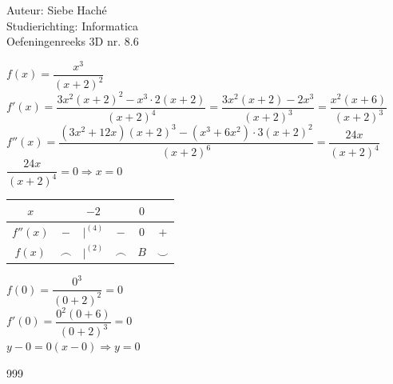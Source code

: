 \documentclass[a4paper]{article}
\begin{document}
  
\noindent \large Auteur: Siebe Haché \\
\noindent \large Studierichting: Informatica\\
\noindent \large Oefeningenreeks 3D nr. 8.6\\

\medskip
\normalsize

$ f(x) = \dfrac{x^{3}}{(x + 2)^{2}} $ \\

$ f'(x) = \dfrac{3x^{2}(x+2)^{2} - x^{3} \cdot 2(x+2)}{(x+2)^{4}} = \dfrac{3x^{2}(x+2) - 2x^{3}}{(x+2)^{3}} = \dfrac{x^{2}(x+6)}{(x+2)^{3}} $ \\

$ f''(x) = \dfrac{(3x^{2}+12x)(x+2)^{3} - (x^{3}+6x^{2}) \cdot 3(x+2)^{2}}{(x+2)^{6}} = \dfrac{24x}{(x+2)^{4}} $ \\

$ \dfrac{24x}{(x+2)^{4}} = 0 \Rightarrow x = 0$\\

\begin{tabular}{c|ccccc} 
	$x$	&		&	$-2$	&		&	$0$	&	 \\ \hline
        
	$f''(x)$          & $-$                 & $|^{(4)}$               & $-$                   & $0$             & $+$ \\ \hline

  $f(x)$  & $\frown$ & $|^{(2)}$  & $\frown$ & $B$  & $\smile$\\
        
\end{tabular}

$ f(0) = \dfrac{0^{3}}{(0 + 2)^{2}} = 0 $ \\

$ f'(0) = \dfrac{0^{2}(0+6)}{(0+2)^{3}} = 0 $ \\

$y - 0 = 0(x - 0) \Rightarrow y = 0 $\\

\begin{thebibliography}{999}
\end{thebibliography}
\end{document}
